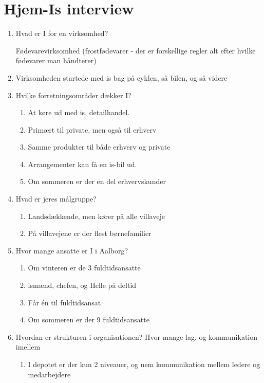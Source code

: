 \chapter{Hjem-Is interview}\label{app:interview}
\begin{enumerate}
    \item Hvad er I for en virksomhed?
    \begin{enumerate}
        Fødevarevirksomhed (frostfødevarer - der er forskellige regler alt efter hvilke fødevarer man håndterer)
    \end{enumerate}
    \item Virksomheden startede med is bag på cyklen, så bilen, og så videre
    \item Hvilke forretningsområder dækker I?
    \begin{enumerate}
        \item At køre ud med is, detailhandel. 
        \item Primært til private, men også til erhverv
        \item Samme produkter til både erhverv og private
        \item Arrangementer kan få en is-bil ud.
        \item Om sommeren er der en del erhvervskunder
    \end{enumerate}
    \item Hvad er jeres målgruppe?
    \begin{enumerate}
        \item Landsdækkende, men kører på alle villaveje
        \item På villavejene er der flest børnefamilier        
    \end{enumerate}
    \item Hvor mange ansatte er I i Aalborg?
    \begin{enumerate}
        \item Om vinteren er de 3 fuldtidsansatte \item ismænd, chefen, og Helle på deltid
        \item Får én til fuldtidsansat
        \item Om sommeren er der 9 fuldtidsansatte
    \end{enumerate}
    \item Hvordan er strukturen i organisationen? Hvor mange lag, og kommunikation imellem
    \begin{enumerate}
        \item I depotet er der kun 2 niveauer, og nem kommunikation mellem ledere og medarbejdere

\end{enumerate}
\end{enumerate}
